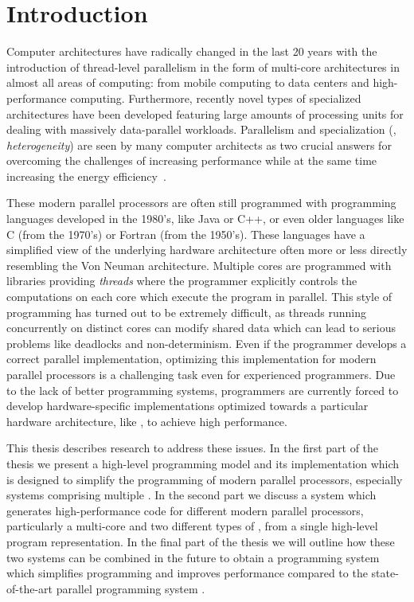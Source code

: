 
\chapter{Introduction} %

\label{ch:introduction} %

Computer architectures have radically changed in the last 20 years with the introduction of thread-level parallelism in the form of multi-core architectures in almost all areas of computing:
from mobile computing to data centers and high-performance computing.
Furthermore, recently novel types of specialized architectures have been developed featuring large amounts of processing units for dealing with massively data-parallel workloads.
Parallelism and specialization (\aka, \emph{heterogeneity}) are seen by many computer architects as two crucial answers for overcoming the challenges of increasing performance while at the same time increasing the energy efficiency~\cite{}.

These modern parallel processors are often still programmed with programming languages developed in the 1980's, like Java or C++, or even older languages like C (from the 1970's) or Fortran (from the 1950's).
These languages have a simplified view of the underlying hardware architecture often more or less directly resembling the Von Neuman architecture.
Multiple cores are programmed with libraries providing \emph{threads} where the programmer explicitly controls the computations on each core which execute the program in parallel.
This style of programming has turned out to be extremely difficult, as threads running concurrently on distinct cores can modify shared data which can lead to serious problems like deadlocks and non-determinism.
Even if the programmer develops a correct parallel implementation, optimizing this implementation for modern parallel processors is a challenging task even for experienced programmers.
Due to the lack of better programming systems, programmers are currently forced to develop hardware-specific implementations optimized towards a particular hardware architecture, like \GPUs, to achieve high performance.

This thesis describes research to address these issues.
In the first part of the thesis we present a high-level programming model and its implementation which is designed to simplify the programming of modern parallel processors, especially systems comprising multiple \GPUs.
In the second part we discuss a system which generates high-performance code for different modern parallel processors, particularly a multi-core \CPU and two different types of \GPUs, from a single high-level program representation.
In the final part of the thesis we will outline how these two systems can be combined in the future to obtain a programming system which simplifies programming and improves performance compared to the state-of-the-art parallel programming system \OpenCL.

